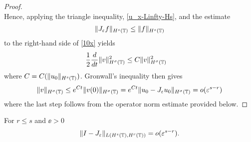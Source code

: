\begin{proof}
\begin{equation}
\end{equation}
%
%
Hence, applying the triangle inequality, \eqref{u_x-Linfty-Hs}, and the estimate
%
%
\begin{equation}
\begin{split}
	\|J_\varepsilon f\|_{H^s(\mathbb{T})} \le \|f\|_{H^s(\mathbb{T})}
\label{lem100u}
\end{split}
\end{equation}
%
%
%
%
to the right-hand side of \eqref{10x} yields
%
%
%
%
%
\begin{equation*}
\begin{split}
\label{12x}
\frac{1}{2}\frac{d}{dt} \|v\|_{H^{\sigma}(\mathbb{T})}^2
& \le
C \|v\|_{H^{\sigma}(\mathbb{T})}^2
\end{split}
\end{equation*}
%
%
where $C = C(\|u_0\|_{H^s(\mathbb{T})})$. Gronwall's inequality then gives
%
%
%
\begin{equation*}
\label{conc-lemma}
\begin{split}
\|v\|_{H^{\sigma}(\mathbb{T})}
 \le e^{C t}\|v(0)\|_{H^{\sigma}(\mathbb{T})}
 = e^{C t}\|u_0 - J_\varepsilon u_0 \|_{H^{\sigma}(\mathbb{T})} = o(\varepsilon^{s-r})
\end{split}
\end{equation*}
%
%
%
%
%
where the last step follows from the operator norm estimate provided below. 
\end{proof}
%
%
\begin{lemma}
\label{lem4r}
For $r \le s$ and $\ee>0$
%
%
\begin{equation}
\label{0r}
\begin{split}
\|I - J_\varepsilon\|_{L(H^s(\mathbb{T}), H^r(\mathbb{T}))} = o(\varepsilon^{s-r}).
\end{split}
\end{equation}
%
%
\end{lemma}
%
%
